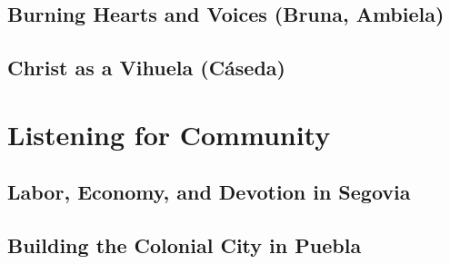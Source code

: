 \documentclass{vcbook}
\begin{document}
\chapter{Burning Hearts and Voices (Bruna, Ambiela)}
% 

\chapter{Christ as a Vihuela (Cáseda)}
% 

\part{Listening for Community}

\chapter{Labor, Economy, and Devotion in Segovia}
% 

\chapter{Building the Colonial City in Puebla}
% 

\printbibliography

% 
\end{document}
